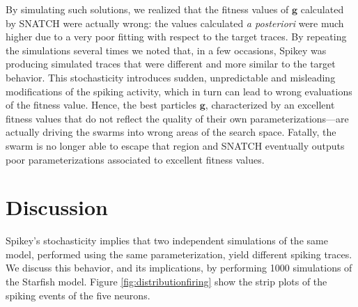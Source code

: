 \documentclass[utf8]{frontiersFPHY} %
\newcommand {\name}{SNATCH}
\begin{document}


By simulating such solutions, we realized that the fitness values of $\textbf{g}$ calculated by \name{} were actually wrong: the values calculated \emph{a posteriori}  were much higher due to a very poor fitting with respect to the target traces.
By repeating the simulations several times we noted that, in a few occasions,  Spikey was producing simulated traces that were different and more similar to the target behavior.
This stochasticity introduces  sudden, unpredictable and misleading modifications of the spiking activity, which in turn can lead to wrong evaluations of the fitness value.
Hence, the best particles $\textbf{g}$, characterized by an excellent fitness values that do not reflect the quality of their own parameterizations---are actually driving the swarms into wrong areas of the search space.
Fatally, the swarm is no longer able to escape that region and \name{} eventually outputs poor parameterizations associated to excellent fitness values.


\section{Discussion}
\label{sec:discussion}
Spikey's  stochasticity implies that two independent simulations of the same model, performed using the same parameterization, yield different spiking traces.
We discuss this behavior, and its implications, by performing 1000 simulations of the Starfish model. 
Figure \ref{fig:distributionfiring} show the strip plots of the spiking events of the five neurons. 
\end{document}
